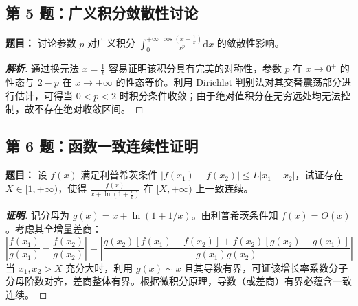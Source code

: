 \documentclass[11pt,a4paper]{article}
\newcommand{\dd}{\mathrm{d}}
\begin{document}
	\begin{tcolorbox}[examstyle]
		\subsection*{第 5 题：广义积分敛散性讨论}
		\textbf{题目：} 讨论参数 $p$ 对广义积分 $\int_0^{+\infty} \frac{\cos\left(x - \frac{1}{x}\right)}{x^p} \dd x$ 的敛散性影响。
		
		\begin{proof}[\textbf{解析}]
			通过换元法 $x = \frac{1}{t}$ 容易证明该积分具有完美的对称性，参数 $p$ 在 $x\to0^+$ 的性态与 $2-p$ 在 $x\to+\infty$ 的性态等价。利用 Dirichlet 判别法对其交替震荡部分进行估计，可得当 $0 < p < 2$ 时积分条件收敛；由于绝对值积分在无穷远处均无法控制，故不存在绝对收敛区间。
		\end{proof}
	\end{tcolorbox}
	
	\begin{tcolorbox}[examstyle]
		\subsection*{第 6 题：函数一致连续性证明}
		\textbf{题目：} 设 $f(x)$ 满足利普希茨条件 $|f(x_1) - f(x_2)| \le L|x_1 - x_2|$，试证存在 $X \in [1,+\infty)$，使得 $\frac{f(x)}{x + \ln\left(1+\frac{1}{x}\right)}$ 在 $[X,+\infty)$ 上一致连续。
		
		\begin{proof}[\textbf{证明}]
			记分母为 $g(x) = x + \ln(1+1/x)$。由利普希茨条件知 $f(x) = O(x)$。考虑其全增量差商：
			$$ \left| \frac{f(x_1)}{g(x_1)} - \frac{f(x_2)}{g(x_2)} \right| = \left| \frac{g(x_2)[f(x_1) - f(x_2)] + f(x_2)[g(x_2) - g(x_1)]}{g(x_1)g(x_2)} \right| $$
			当 $x_1, x_2 > X$ 充分大时，利用 $g(x) \sim x$ 且其导数有界，可证该增长率系数分子分母阶数对齐，差商整体有界。根据微积分原理，导数（或差商）有界必蕴含一致连续。
		\end{proof}
	\end{tcolorbox}
	
\end{document}
